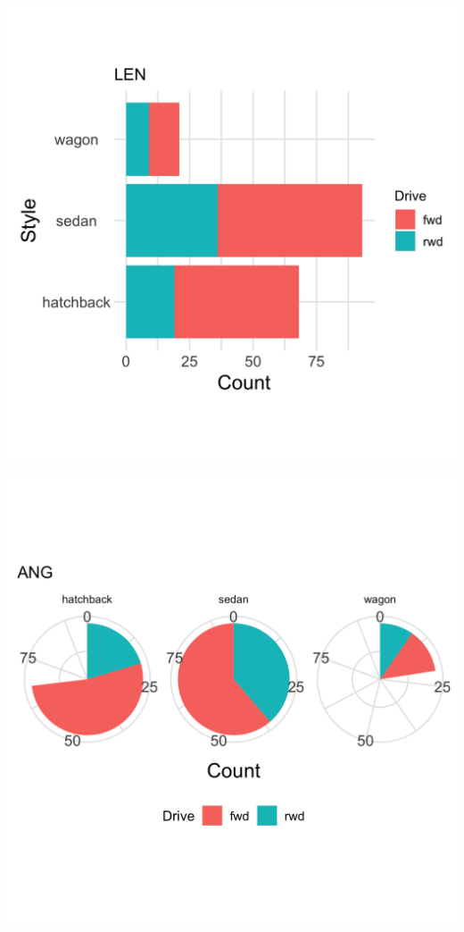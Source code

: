 \documentclass[]{article}
\newcommand{\setwidth}{0.40\textwidth}
\begin{document}
\hspace*{\fill}
\begin{minipage}{\setwidth}
  \centering
  \includegraphics[width=1.00\textwidth]{../images/03_length}
\end{minipage} %
\hfill\vline\hfill
\begin{minipage}{\setwidth}
  \centering
  \includegraphics[width=1.00\textwidth]{../images/04_angle}
\end{minipage}
\hspace*{\fill}
\end{document}
